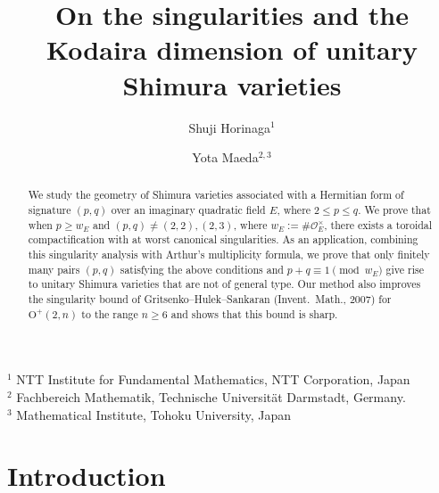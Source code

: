 \documentclass[11pt]{amsart}
\theoremstyle{plain}
\theoremstyle{definition}
\numberwithin{equation}{section}
\def\OO{\mathscr{O}}
\def\O{\mathrm{O}}
\begin{document}
\title[On the singularities and the Kodaira dimension of unitary Shimura varieties]{On the singularities and the Kodaira dimension of unitary Shimura varieties}
\author{Shuji Horinaga$^{1}$ \and Yota Maeda$^{2,3}$}

\def\l@subsection{\@tocline{2}{0pt}{2.3pc}{5pc}{}}






\maketitle
\vspace{-1em}
\begin{center}
  \begin{minipage}{0.9\textwidth}
    \centering
    {\small
    $^{1}$ NTT Institute for Fundamental Mathematics, NTT Corporation, Japan\\
    $^{2}$ Fachbereich Mathematik, Technische Universität Darmstadt, Germany.\\
    $^{3}$ Mathematical Institute, Tohoku University, Japan\\
    }
  \end{minipage}
\end{center}

\vspace{1em}

\begin{abstract}
We study the geometry of Shimura varieties associated with a Hermitian form of signature $(p,q)$ over an imaginary quadratic field $E$, where $2\leq p\leq q$.
We prove that when $p\geq w_E$ and $(p,q)\neq(2,2),(2,3)$, where $w_E:=\#\OO_E^\times$, there exists a toroidal compactification with at worst canonical singularities.
As an application, combining this singularity analysis with Arthur's multiplicity formula, we prove that only finitely many pairs $(p,q)$ satisfying the above conditions and $p+q\equiv1\pmod{w_E}$ give rise to unitary Shimura varieties that are not of general type.
Our method also improves the singularity bound of Gritsenko--Hulek--Sankaran (Invent.\ Math., 2007) for $\O^+(2,n)$ to the range $n\geq6$ and shows that this bound is sharp.
\end{abstract}



\section{Introduction}
\end{document}
